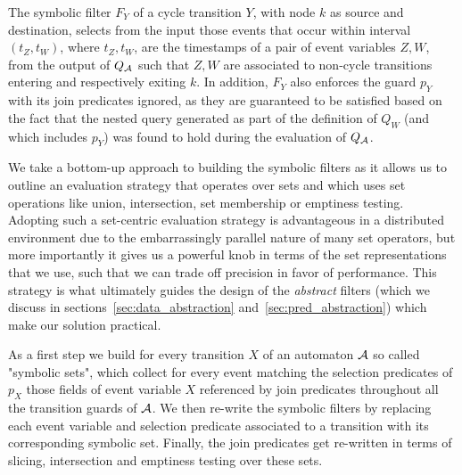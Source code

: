 The symbolic filter $F_Y$ of a cycle transition $Y$, with node $k$ as source 
and destination, selects from the input those events that occur within interval 
$(t_Z, t_W)$, where $t_Z, t_W$, are the timestamps of a pair of event variables 
$Z, W$, from the output of $Q_{\mathcal{A}}$ such that $Z, W$ are associated to 
non-cycle transitions entering and respectively exiting $k$.
In addition, $F_Y$ also enforces the guard $p_Y$ with its join predicates 
ignored, as they are guaranteed to be satisfied based on the fact that the 
nested query generated as part of the definition of $Q_W$ (and which includes 
$p_Y$) was found to hold during the evaluation of $Q_{\mathcal{A}}$.

\begin{comment} 
The two kinds of transitions (cycle vs non-cycle) generate distinctly different 
kinds of symbolic filters. 
While both make use of the relational query $Q_{\cA}$ generated for the 
automaton, only the filter for cycle transitions makes direct use of its results
while the other simply uses $Q_{\cA}$'s expression as a starting point for its 
definition.
This distinction plays an important role in how we go about building these 
filters in a distributed environment.
\end{comment}


We take a bottom-up approach to building the symbolic filters as it allows us 
to outline an evaluation strategy that operates over sets and which uses set 
operations like union, intersection, set membership or emptiness testing. 
Adopting such a set-centric evaluation strategy is advantageous in a 
distributed environment due to the embarrassingly parallel nature of many set 
operators, but more importantly it gives us a powerful knob in terms of the set 
representations that we use, such that we can trade off precision in favor of 
performance. 
This strategy is what ultimately guides the design of the {\em abstract} 
filters (which we discuss in sections~\ref{sec:data_abstraction} 
and~\ref{sec:pred_abstraction}) which make our solution practical.
   

As a first step we build for every transition $X$ of an automaton $\mathcal{A}$ so 
called "symbolic sets", which collect for every event matching the selection 
predicates of $p_X$ those fields of event variable $X$ referenced by join 
predicates throughout all the transition guards of $\mathcal{A}$.
We then re-write the symbolic filters by replacing each event variable and 
selection predicate associated to a transition with its corresponding symbolic 
set.
Finally, the join predicates get re-written in terms of slicing, intersection 
and emptiness testing over these sets.


